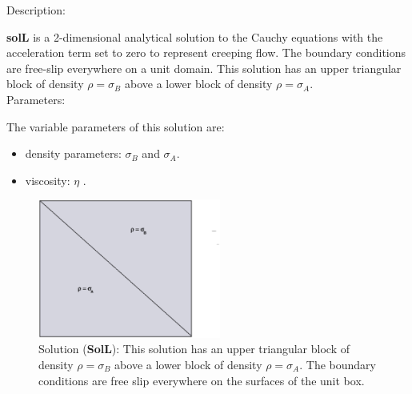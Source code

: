   {\large \fontB Description:}
  
  {\bf solL} is a 2-dimensional analytical solution to the Cauchy equations with the acceleration term set to zero
  to represent creeping flow. The boundary conditions are free-slip everywhere on a unit domain. 
  This solution has an upper triangular block of density $\rho = \sigma_B$ above
      a lower block of density $\rho = \sigma_A$.
  \\

  {\large \fontB Parameters:}
 
  The variable parameters of this solution are:
  \begin{itemize}
    \item{density parameters: $ \sigma_B $ and $ \sigma_A $.}
    \item{viscosity: $\eta$ .}
    \end{itemize}

  \begin{figure}
    \includegraphics[width=6cm,clip]{../figs/figL.eps}
    \caption[Short caption]{\label{figL} 
      Solution ({\bf SolL}):
      This solution has an upper triangular block of density $\rho = \sigma_B$ above
      a lower block of density $\rho = \sigma_A$.
      The boundary conditions are free slip everywhere on the surfaces of the unit box.}
  \end{figure} 
  

